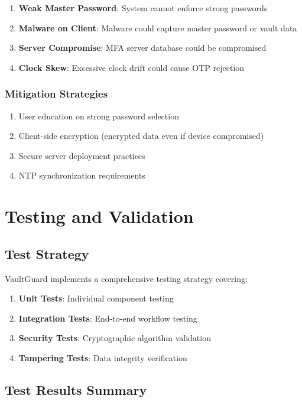 \documentclass[12pt,a4paper]{report}
\begin{document}
\begin{enumerate}
    \item \textbf{Weak Master Password}: System cannot enforce strong passwords
    \item \textbf{Malware on Client}: Malware could capture master password or vault data
    \item \textbf{Server Compromise}: MFA server database could be compromised
    \item \textbf{Clock Skew}: Excessive clock drift could cause OTP rejection
\end{enumerate}

\subsection{Mitigation Strategies}

\begin{enumerate}
    \item User education on strong password selection
    \item Client-side encryption (encrypted data even if device compromised)
    \item Secure server deployment practices
    \item NTP synchronization requirements
\end{enumerate}

\chapter{Testing and Validation}

\section{Test Strategy}

VaultGuard implements a comprehensive testing strategy covering:

\begin{enumerate}
    \item \textbf{Unit Tests}: Individual component testing
    \item \textbf{Integration Tests}: End-to-end workflow testing
    \item \textbf{Security Tests}: Cryptographic algorithm validation
    \item \textbf{Tampering Tests}: Data integrity verification
\end{enumerate}

\section{Test Results Summary}
\end{document}
